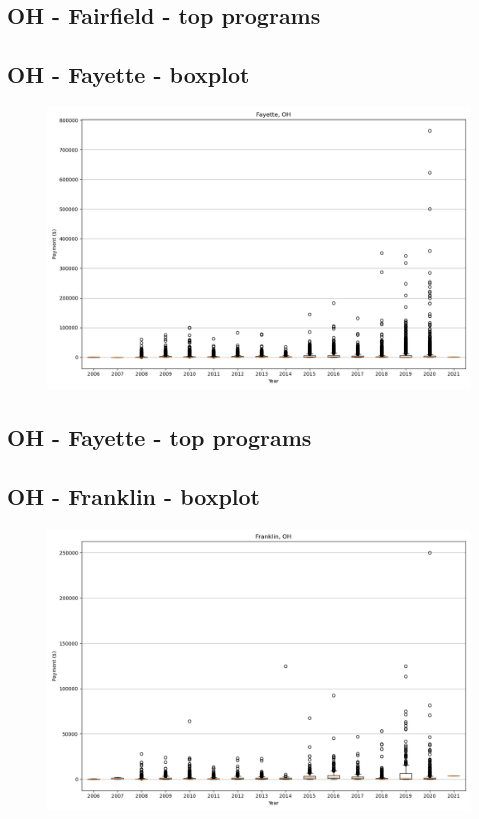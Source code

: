 \subsection*{OH - Fairfield - top programs}

\newpage
\subsection*{OH - Fayette - boxplot}
\begin{figure}[h]
\centering
\includegraphics[width=7in]{../output/boxplots/counties/Fayette-OH_boxplot.png}
\end{figure}


\subsection*{OH - Fayette - top programs}

\newpage
\subsection*{OH - Franklin - boxplot}
\begin{figure}[h]
\centering
\includegraphics[width=7in]{../output/boxplots/counties/Franklin-OH_boxplot.png}
\end{figure}


